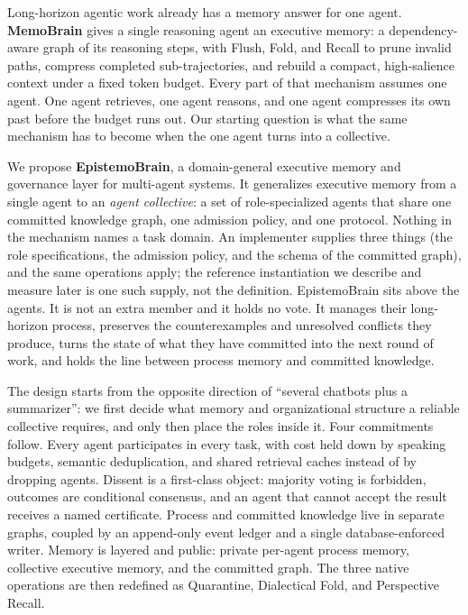 Long-horizon agentic work already has a memory answer for one agent.
\textbf{MemoBrain} \citep{qian2026memobrain} gives a single reasoning agent an
executive memory: a dependency-aware graph of its reasoning steps, with Flush,
Fold, and Recall to prune invalid paths, compress completed sub-trajectories,
and rebuild a compact, high-salience context under a fixed token budget. Every
part of that mechanism assumes one agent. One agent retrieves, one agent
reasons, and one agent compresses its own past before the budget runs out. Our
starting question is what the same mechanism has to become when the one agent
turns into a collective.

We propose \textbf{EpistemoBrain}, a domain-general executive memory and
governance layer for multi-agent systems. It generalizes executive memory from
a single agent to an \emph{agent collective}: a set of role-specialized agents
that share one committed knowledge graph, one admission policy, and one
protocol. Nothing in the mechanism names a task domain. An implementer supplies
three things (the role specifications, the admission policy, and the schema of
the committed graph), and the same operations apply; the reference
instantiation we describe and measure later is one such supply, not the
definition. EpistemoBrain sits above the agents. It is not an extra member and
it holds no vote. It manages their long-horizon process, preserves the
counterexamples and unresolved conflicts they produce, turns the state of what
they have committed into the next round of work, and holds the line between
process memory and committed knowledge.

The design starts from the opposite direction of ``several chatbots plus a
summarizer'': we first decide what memory and organizational structure a
reliable collective requires, and only then place the roles inside it. Four
commitments follow. Every agent participates in every task, with cost held down
by speaking budgets, semantic deduplication, and shared retrieval caches
instead of by dropping agents. Dissent is a first-class object: majority voting
is forbidden, outcomes are conditional consensus, and an agent that cannot
accept the result receives a named certificate. Process and committed knowledge
live in separate graphs, coupled by an append-only event ledger and a single
database-enforced writer. Memory is layered and public: private per-agent
process memory, collective executive memory, and the committed graph. The three
native operations are then redefined as Quarantine, Dialectical Fold, and
Perspective Recall.

